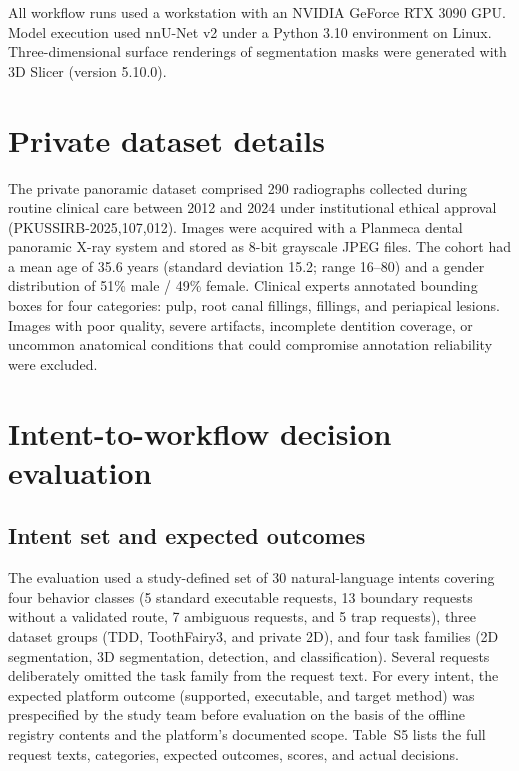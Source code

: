 \documentclass[11pt]{article}
\begin{document}
All workflow runs used a workstation with an NVIDIA GeForce RTX 3090 GPU. Model execution used nnU-Net v2 under a Python 3.10 environment on Linux. Three-dimensional surface renderings of segmentation masks were generated with 3D Slicer (version 5.10.0).

\section{Private dataset details}

The private panoramic dataset comprised 290 radiographs collected during routine clinical care between 2012 and 2024 under institutional ethical approval (PKUSSIRB-2025,107,012). Images were acquired with a Planmeca dental panoramic X-ray system and stored as 8-bit grayscale JPEG files. The cohort had a mean age of 35.6 years (standard deviation 15.2; range 16--80) and a gender distribution of 51\% male / 49\% female. Clinical experts annotated bounding boxes for four categories: pulp, root canal fillings, fillings, and periapical lesions. Images with poor quality, severe artifacts, incomplete dentition coverage, or uncommon anatomical conditions that could compromise annotation reliability were excluded.

\section{Intent-to-workflow decision evaluation}

\subsection{Intent set and expected outcomes}

The evaluation used a study-defined set of 30 natural-language intents covering four behavior classes (5 standard executable requests, 13 boundary requests without a validated route, 7 ambiguous requests, and 5 trap requests), three dataset groups (TDD, ToothFairy3, and private 2D), and four task families (2D segmentation, 3D segmentation, detection, and classification). Several requests deliberately omitted the task family from the request text. For every intent, the expected platform outcome (supported, executable, and target method) was prespecified by the study team before evaluation on the basis of the offline registry contents and the platform's documented scope. Table~S5 lists the full request texts, categories, expected outcomes, scores, and actual decisions.
\end{document}
